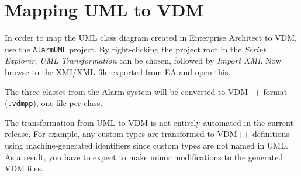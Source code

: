 \section{Mapping UML to  VDM}\label{sec:fromUMLtoVDM}\label{sec:syntaxcheck}
\label{sec:typecheck}

In order to map the UML class diagram created in Enterprise Architect
to VDM, use the \texttt{AlarmUML} project.
By right-clicking the project
root in the \emph{Script Explorer}, \emph{UML Transformation} can be
chosen, followed by \emph{Import XMI}. Now browse to the XMI/XML file
exported from EA and open this.

The three classes from the Alarm system will be converted to VDM++ format
(\texttt{.vdmpp}), one file per class.



The transformation from UML to VDM is not entirely automated in the
current release. For
example, any custom types are transformed to VDM++ definitions using
machine-generated identifiers since custom types are not named in
UML. As a result, you have to expect to make minor modifications to
the generated VDM files. 

%


